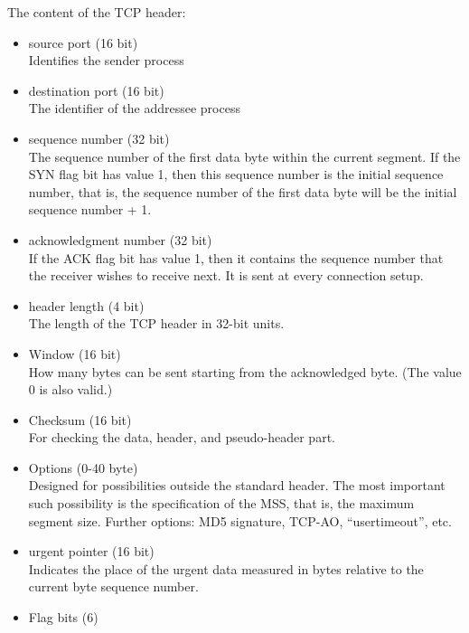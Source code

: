 \documentclass[margin=0px]{article}
\begin{document}
\begin{description}
\begin{itemize}
                  The content of the TCP header:
                  \begin{itemize}
                      \item source port (16 bit)\\
                            Identifies the sender process
                      \item destination port (16 bit)\\
                            The identifier of the addressee process
                      \item sequence number (32 bit)\\
                            The sequence number of the first data byte within the current segment. If the SYN flag bit has value 1, then this sequence number is the initial sequence number, that is, the sequence number of the first data byte will be the initial sequence number + 1.
                      \item acknowledgment number (32 bit)\\
                            If the ACK flag bit has value 1, then it contains the sequence number that the receiver wishes to receive next. It is sent at every connection setup.
                      \item header length (4 bit)\\
                            The length of the TCP header in 32-bit units.
                      \item Window (16 bit)\\
                            How many bytes can be sent starting from the acknowledged byte. (The value 0 is also valid.)
                      \item Checksum (16 bit)\\
                            For checking the data, header, and pseudo-header part.
                      \item Options (0-40 byte)\\
                            Designed for possibilities outside the standard header. The most important such possibility is the specification of the MSS, that is, the maximum segment size. Further options: MD5 signature, TCP-AO, ``usertimeout'', etc.
                      \item urgent pointer (16 bit) \\
                            Indicates the place of the urgent data measured in bytes relative to the current byte sequence number.
                      \item Flag bits (6)

\end{itemize}
\end{itemize}
\end{description}
\end{document}
